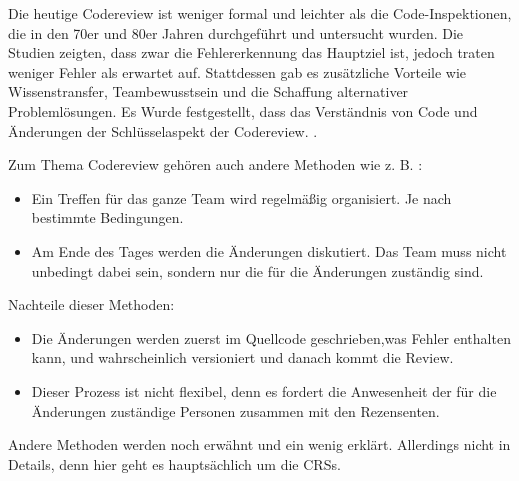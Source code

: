 
Die heutige Codereview ist weniger formal und leichter als die Code-Inspektionen, die in den 70er und 80er Jahren durchgeführt und untersucht wurden. Die Studien zeigten, dass zwar die Fehlererkennung das Hauptziel ist, jedoch traten weniger Fehler als erwartet auf. Stattdessen gab es zusätzliche Vorteile wie Wissenstransfer, Teambewusstsein und die Schaffung alternativer Problemlösungen. Es Wurde festgestellt, dass das Verständnis von Code und Änderungen der Schlüsselaspekt der Codereview. \cite[vgl. Seite 1]{bacchelli2013expectations}.

Zum Thema Codereview gehören auch andere Methoden wie z. B. :

\begin{itemize}
	\item Ein Treffen für das ganze Team wird regelmäßig organisiert. Je nach bestimmte Bedingungen.
	\item Am Ende des Tages werden die Änderungen diskutiert. Das Team muss nicht unbedingt dabei sein, sondern nur die für die Änderungen zuständig sind.
\end{itemize} 

Nachteile dieser Methoden:
\begin{itemize}
	\item Die Änderungen werden zuerst im Quellcode geschrieben,was Fehler enthalten kann, und wahrscheinlich versioniert und danach kommt die Review.
	\item Dieser Prozess ist nicht flexibel, denn es fordert die Anwesenheit der für die Änderungen zuständige Personen zusammen mit den Rezensenten.
\end{itemize}

Andere Methoden werden noch erwähnt und ein wenig erklärt. Allerdings nicht in Details, denn hier geht es hauptsächlich um die \acp{CRS}.
